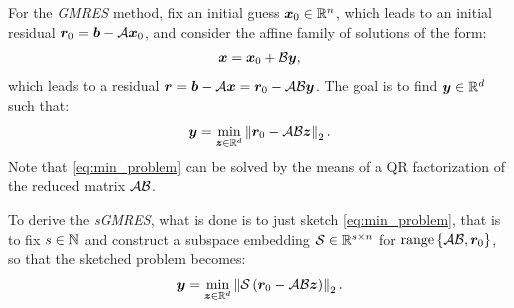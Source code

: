 For the \textit{GMRES} method, fix an initial guess $\bm{x}_0 \in \mathbb{R}^{n}$, which leads to an initial residual $\bm{r}_0 = \bm{b} - \mathcal{A} \bm{x}_0$, and consider the affine family of solutions of the form:
\begin{align}
    \bm{x} = \bm{x}_0 + \mathcal{B} \bm{y},
\end{align}
which leads to a residual $\bm{r} = \bm{b} - \mathcal{A} \bm{x} = \bm{r}_0 - \mathcal{A} \mathcal{B} \bm{y}$. The goal is to find $\bm{y} \in \mathbb{R}^{d}$ such that:
\begin{align}
    \bm{y} = \min_{\bm{z} \in \mathbb{R}^{d}} \left\lVert \bm{r}_0 - \mathcal{A} \mathcal{B} \bm{z} \right\rVert_2. \label{eq:min_problem}
\end{align}
Note that \cref{eq:min_problem} can be solved by the means of a QR factorization of the reduced matrix $\mathcal{A} \mathcal{B}$.

To derive the \textit{sGMRES}, what is done is to just sketch \cref{eq:min_problem}, that is to fix $s \in \mathbb{N}$ and construct a subspace embedding $\mathcal{S} \in \mathbb{R}^{s \times n}$ for $\operatorname*{range}\left\{\mathcal{A} \mathcal{B}, \bm{r}_0\right\}$, so that the sketched problem becomes:
\begin{align}
    \bm{y} = \min_{\bm{z} \in \mathbb{R}^{d}} \left\lVert  \mathcal{S} \left( \bm{r}_0 - \mathcal{A} \mathcal{B} \bm{z} \right) \right\rVert_2. \label{eq:sketched_min_problem}
\end{align}